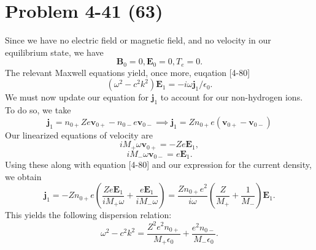 \section*{Problem 4-41 (63)}
\label{sec:4-41}
Since we have no electric field or magnetic field, and no velocity in our equilibrium state, we have 
\begin{equation*}
	\bm{B}_0 = 0, \bm{E}_0 = 0, T_e = 0.
\end{equation*}
The relevant Maxwell equations yield, once more, euqation [4-80]
\begin{equation*}
	(\omega^2 - c^2k^2 )\bm{E}_1 = -i\omega\bm{j}_1/\epsilon_0.
\end{equation*}
We must now update our equation for \(\bm{j}_1 \) to account for our non-hydrogen ions. To do so, we take
\begin{equation*}
	\bm{j}_1 = n_{0+}Ze\bm{v}_{0+} - n_{0-}e\bm{v}_{0-} \implies \bm{j}_1 = Zn_{0+}e\left(\bm{v}_{0+} - \bm{v}_{0-}\right)
\end{equation*}
Our linearized equations of velocity are
\begin{equation*}
	iM_+\omega\bm{v}_{0+} = -Ze\bm{E}_1,
\end{equation*}
\begin{equation*}
	iM_-\omega\bm{v}_{0-} = e\bm{E}_1.
\end{equation*}
Using these along with equation [4-80] and our expression for the current density, we obtain
\begin{equation*}
	\bm{j}_1 = -Zn_{0+}e\left(\dfrac{Ze\bm{E}_1}{iM_+\omega} + \dfrac{e\bm{E}_1}{iM_-\omega}\right) = \dfrac{Zn_{0+}e^2}{i\omega}\left(\dfrac{Z}{M_+} + \dfrac{1}{M_-}\right)\bm{E}_1.
\end{equation*}
This yields the following dispersion relation:
\begin{equation*}
	\omega^2 - c^2k^2 = \dfrac{Z^2e^2n_{0+}}{M_+\epsilon_0} + \dfrac{e^2n_{0-}}{M_-\epsilon_0}.
\end{equation*}

